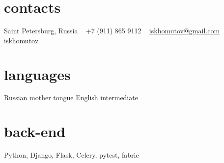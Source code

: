 \documentclass[]{cv-style}
\begin{document}


\begin{aside}
%
%
\section{contacts}
\faMapMarker{} Saint Petersburg, Russia
~
\faMobilePhone{} +7 (911) 865 9112
~
\faEnvelope{} \href{mailto:iskhomutov@gmail.com}{iskhomutov@gmail.com}
~
\faGithub{} \href{http://github.com/iskhomutov}{iskhomutov}
%
\section{languages}
Russian mother tongue
English intermediate
%
\section{back-end}
Python, Django, Flask, Celery, pytest, fabric
%

\end{aside}
\end{document}
